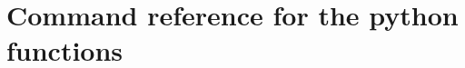 \documentclass[a4paper]{article}
\begin{document}
\newpage

\appendix

\def\tableofcontents{}
\section{Command reference for the python functions}
\label{reference_facade}

\end{document}
